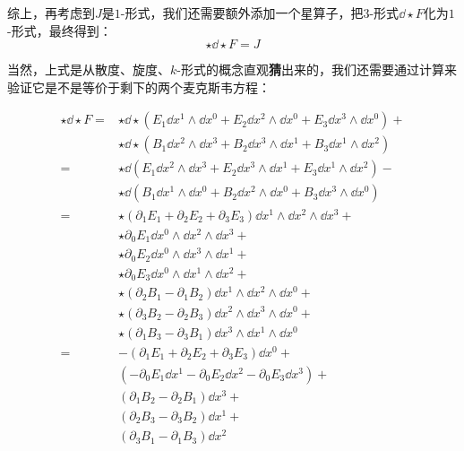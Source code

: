 综上，再考虑到$J$是$1$-形式，我们还需要额外添加一个星算子，把$3$-形式$\dd \star F$化为$1$-形式，最终得到：
\begin{equation}
    \star \dd \star F = J
\end{equation}

当然，上式是从散度、旋度、$k$-形式的概念直观\textbf{猜}出来的，我们还需要通过计算来验证它是不是等价于剩下的两个麦克斯韦方程：


\begin{equation}
    \begin{aligned}
        \star \dd \star F ={}& \star \dd \star (E_1\dd x^1\wedge \dd x^0 + E_2\dd x^2\wedge \dd x^0 + E_3\dd x^3\wedge \dd x^0)+\\
        & \star \dd \star (B_1\dd x^2\wedge \dd x^3+B_2\dd x^3\wedge \dd x^1 + B_3\dd x^1\wedge \dd x^2)\\
        ={}
        & \star \dd (E_1\dd x^2\wedge \dd x^3 + E_2\dd x^3\wedge \dd x^1 + E_3\dd x^1\wedge \dd x^2)-\\
        & \star \dd (B_1\dd x^1\wedge \dd x^0 + B_2\dd x^2\wedge \dd x^0 + B_3\dd x^3\wedge \dd x^0)\\
        ={}
        & \star (\partial_1E_1+\partial_2E_2+\partial_3E_3)\dd x^1\wedge \dd x^2\wedge \dd x^3+\\
        & \star \partial_0E_1\dd x^0\wedge \dd x^2\wedge \dd x^3 +\\
        & \star \partial_0E_2\dd x^0\wedge \dd x^3\wedge \dd x^1 +\\
        & \star \partial_0E_3\dd x^0\wedge \dd x^1\wedge \dd x^2+\\
        & \star (\partial_2B_1-\partial_1B_2)\dd x^1\wedge \dd x^2 \wedge \dd x^0+\\
        & \star (\partial_3B_2-\partial_2B_3)\dd x^2\wedge \dd x^3 \wedge \dd x^0+\\
        & \star (\partial_1B_3-\partial_3B_1)\dd x^3\wedge \dd x^1 \wedge \dd x^0\\
        ={}
        & -(\partial_1E_1+\partial_2E_2+\partial_3E_3)\dd x^0+\\
        & (-\partial_0 E_1\dd x^1-\partial_0 E_2\dd x^2-\partial_0 E_3\dd x^3)+\\
        & (\partial_1B_2-\partial_2B_1)\dd x^3+\\
        & (\partial_2B_3-\partial_3B_2)\dd x^1+\\
        & (\partial_3B_1-\partial_1B_3)\dd x^2
    \end{aligned}
\end{equation}

